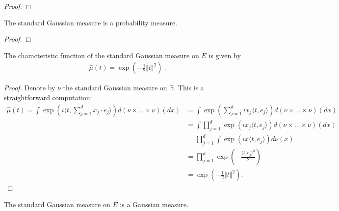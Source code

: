 \begin{proof}  

\end{proof}


\begin{lemma}\label{lem:isProbabilityMeasure_stdGaussian}
The standard Gaussian measure is a probability measure.
\end{lemma}

\begin{proof}
\end{proof}


\begin{lemma}\label{lem:charFun_stdGaussian}
The characteristic function of the standard Gaussian measure on $E$ is given by
\begin{align*}
  \hat{\mu}(t) = \exp\left(-\frac{1}{2} \Vert t \Vert^2 \right) \: .
\end{align*}
\end{lemma}

\begin{proof}  
Denote by $\nu$ the standard Gaussian measure on $\mathbb{R}$. This is a straightforward computation:
\begin{align*}
  \hat{\mu}(t) = \int \exp\left(i\langle t, \sum_{j=1}^d x_j \cdot e_j \rangle\right) d(\nu \times \ldots \times \nu)(dx) &= \int \exp\left(\sum_{j=1}^d ix_j\langle t, e_j \rangle\right) d(\nu \times \ldots \times \nu)(dx) \\
  &= \int \prod_{j=1}^d \exp\left(ix_j\langle t, e_j \rangle\right) d(\nu \times \ldots \times \nu)(dx) \\
  &= \prod_{j=1}^d \int \exp\left(ix\langle t, e_j \rangle\right) d\nu(x) \\
  &= \prod_{j=1}^d \exp\left(-\frac{\langle t, e_j \rangle^2}{2}\right) \\
  &= \exp\left(-\frac{1}{2} \Vert t \Vert^2 \right).
\end{align*}
\end{proof}


\begin{lemma}\label{lem:isGaussian_stdGaussian}
The standard Gaussian measure on $E$ is a Gaussian measure.
\end{lemma}

